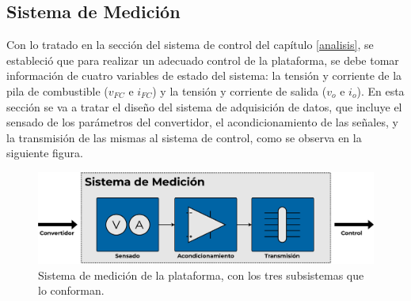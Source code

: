\subsection{Sistema de Medición}

Con lo tratado en la sección del sistema de control del capítulo \ref{analisis}, se estableció que para realizar un adecuado control de la plataforma, se debe tomar información de cuatro variables de estado del sistema: la tensión y corriente de la pila de combustible ($v_{FC}$ e $i_{FC}$) y la tensión y corriente de salida ($v_o$ e $i_o$). En esta sección se va a tratar el diseño del sistema de adquisición de datos, que incluye el sensado de los parámetros del convertidor, el acondicionamiento de las señales, y la transmisión de las mismas al sistema de control, como se observa en la siguiente figura.\\

\begin{figure}[h]
    \centering
    \includegraphics[scale=0.4]{Imagenes/Sistema Medicion.pdf}
    \caption{Sistema de medición de la plataforma, con los tres subsistemas que lo conforman.}
    \label{diag_medicion}
\end{figure}

\lipsum[1]\\

\lipsum[2]\\

\lipsum[3]\\